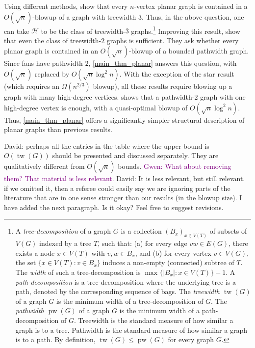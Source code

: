 \documentclass{patmorin}
\renewcommand{\leq}{\leqslant}
\newcommand{\david}[1]{{\color{orange} David: #1}}
\newcommand{\gwen}[1]{\textcolor{Purple}{Gwen: #1}}
\newcommand{\defin}[1]{\emph{\textcolor{brightmaroon}{#1}}}
\DeclareMathOperator{\tw}{tw}
\DeclareMathOperator{\pw}{pw}
\begin{document}
Using different methods, \citet{ISW} show that every $n$-vertex planar graph is contained in a $O(\sqrt{n})$-blowup of a graph with treewidth 3. Thus, in the above question, one can take $\mathcal{H}$ to be the class of treewidth-$3$ graphs.\footnote{A \defin{tree-decomposition} of a graph $G$ is a collection $(B_x)_{x \in V(T)}$ of subsets of $V(G)$ indexed by a tree $T$, such that: (a) for every edge ${vw \in E(G)}$, there exists a node ${x \in V(T)}$ with ${v,w \in B_x}$, and (b) for every vertex ${v \in V(G)}$, the set $\{ x \in V(T) \colon v \in B_x \}$ induces a non-empty (connected) subtree of $T$. The \defin{width} of such a tree-decomposition is ${\max\{ |B_x| \colon x \in V(T) \}-1}$. A \defin{path-decomposition} is a tree-decomposition where the underlying tree is a path, denoted by the corresponding sequence of bags. The \defin{treewidth $\tw(G)$} of a graph $G$ is the minimum width of a tree-decomposition of $G$. The \defin{pathwidth $\pw(G)$} of a graph $G$ is the minimum width of a path-decomposition of $G$. Treewidth is the standard measure of how similar a graph is to a tree. Pathwidth is the standard measure of how similar a graph is to a path. By definition, $\tw(G)\leq\pw(G)$ for every graph $G$.}
Improving this result, \citet{distel.dujmovic.ea:product} show that even the class of treewidth-$2$ graphs is sufficient. They  ask whether every planar graph is contained in an $O(\sqrt{n})$-blowup of a bounded pathwidth graph.
Since fans have pathwidth $2$, \cref{main_thm_planar} answers this question, with $O(\sqrt{n})$ replaced by $O(\sqrt{n}\log^2 n)$.  With the exception of the star result (which requires an $\Omega(n^{2/3})$ blowup), all these results require blowing up a graph with many high-degree vertices.   shows that a pathwidth-$2$ graph with one high-degree vertex is enough, with a quasi-optimal blowup of $O(\sqrt{n}\log^2 n)$.  Thus, \cref{main_thm_planar} offers a significantly simpler structural description of planar graphs than previous results.



\david{perhaps all the entries in the table where the upper bound is $O(\tw(G))$ should be presented and discussed separately. They are qualitatively different from $O(\sqrt{n})$ bounds.}
\gwen{What about removing them? That material is less relevant.} \david{It is less relevant, but still relevant. if we omitted it, then a referee could easily say we are ignoring parts of the literature that are in one sense stronger than our results (in the blowup size). I have added the next paragraph. Is it okay? Feel free to suggest revisions.}
\end{document}
